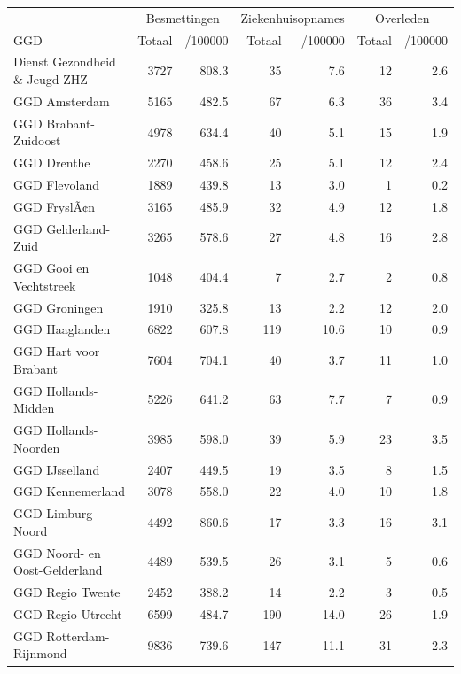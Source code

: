 \documentclass[
  english,
  man,floatsintext]{apa6}
\begin{document}
\begin{table}
\centering\begingroup\fontsize{10}{12}\selectfont

\begin{threeparttable}
\begin{tabular}{lrrrrrr}
\toprule
\multicolumn{1}{c}{ } & \multicolumn{2}{c}{Besmettingen} & \multicolumn{2}{c}{Ziekenhuisopnames} & \multicolumn{2}{c}{Overleden} \\
\cmidrule(l{3pt}r{3pt}){2-3} \cmidrule(l{3pt}r{3pt}){4-5} \cmidrule(l{3pt}r{3pt}){6-7}
GGD & Totaal & /100000 & Totaal & /100000 & Totaal & /100000\\
\midrule
Dienst Gezondheid \& Jeugd ZHZ & 3727 & 808.3 & 35 & 7.6 & 12 & 2.6\\
GGD Amsterdam & 5165 & 482.5 & 67 & 6.3 & 36 & 3.4\\
GGD Brabant-Zuidoost & 4978 & 634.4 & 40 & 5.1 & 15 & 1.9\\
GGD Drenthe & 2270 & 458.6 & 25 & 5.1 & 12 & 2.4\\
GGD Flevoland & 1889 & 439.8 & 13 & 3.0 & 1 & 0.2\\
GGD FryslÃ¢n & 3165 & 485.9 & 32 & 4.9 & 12 & 1.8\\
GGD Gelderland-Zuid & 3265 & 578.6 & 27 & 4.8 & 16 & 2.8\\
GGD Gooi en Vechtstreek & 1048 & 404.4 & 7 & 2.7 & 2 & 0.8\\
GGD Groningen & 1910 & 325.8 & 13 & 2.2 & 12 & 2.0\\
GGD Haaglanden & 6822 & 607.8 & 119 & 10.6 & 10 & 0.9\\
GGD Hart voor Brabant & 7604 & 704.1 & 40 & 3.7 & 11 & 1.0\\
GGD Hollands-Midden & 5226 & 641.2 & 63 & 7.7 & 7 & 0.9\\
GGD Hollands-Noorden & 3985 & 598.0 & 39 & 5.9 & 23 & 3.5\\
GGD IJsselland & 2407 & 449.5 & 19 & 3.5 & 8 & 1.5\\
GGD Kennemerland & 3078 & 558.0 & 22 & 4.0 & 10 & 1.8\\
GGD Limburg-Noord & 4492 & 860.6 & 17 & 3.3 & 16 & 3.1\\
GGD Noord- en Oost-Gelderland & 4489 & 539.5 & 26 & 3.1 & 5 & 0.6\\
GGD Regio Twente & 2452 & 388.2 & 14 & 2.2 & 3 & 0.5\\
GGD Regio Utrecht & 6599 & 484.7 & 190 & 14.0 & 26 & 1.9\\
GGD Rotterdam-Rijnmond & 9836 & 739.6 & 147 & 11.1 & 31 & 2.3\\

\end{tabular}
\end{threeparttable}
\end{table}
\end{document}
